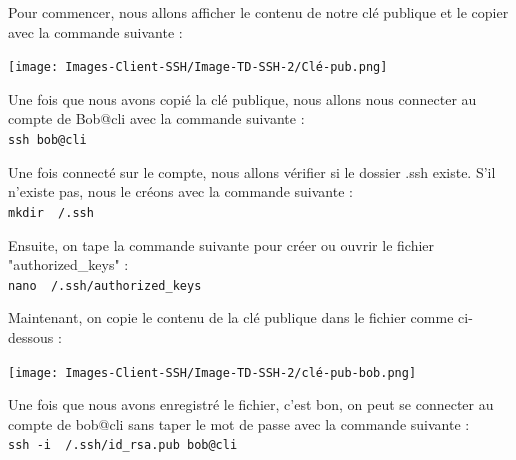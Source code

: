 \documentclass[12pt]{article}
\begin{document}
\vspace{0.3cm}

Pour commencer, nous allons afficher le contenu de notre clé publique et le copier avec la commande suivante :

\vspace{0.3cm}

\begin{center}
  \texttt{[image: Images-Client-SSH/Image-TD-SSH-2/Clé-pub.png]}
\end{center}

\vspace{0.3cm}

\newpage

Une fois que nous avons copié la clé publique, nous allons nous connecter au compte de Bob@cli avec la commande suivante : \\

\texttt{ssh bob@cli}

\vspace{0.3cm}

Une fois connecté sur le compte, nous allons vérifier si le dossier .ssh existe. S'il n'existe pas, nous le créons avec la commande suivante : \\

\texttt{mkdir ~/.ssh}

\vspace{0.3cm}

Ensuite, on tape la commande suivante pour créer ou ouvrir le fichier "authorized_keys" : \\

\texttt{nano ~/.ssh/authorized\_keys}

\vspace{0.3cm}

Maintenant, on copie le contenu de la clé publique dans le fichier comme ci-dessous :

\vspace{0.3cm}

\begin{center}
  \texttt{[image: Images-Client-SSH/Image-TD-SSH-2/clé-pub-bob.png]}
\end{center}

\vspace{0.3cm}

Une fois que nous avons enregistré le fichier, c'est bon, on peut se connecter au compte de bob@cli sans taper le mot de passe avec la commande suivante : \\  

\texttt{ssh -i ~/.ssh/id\_rsa.pub bob@cli}
\end{document}
